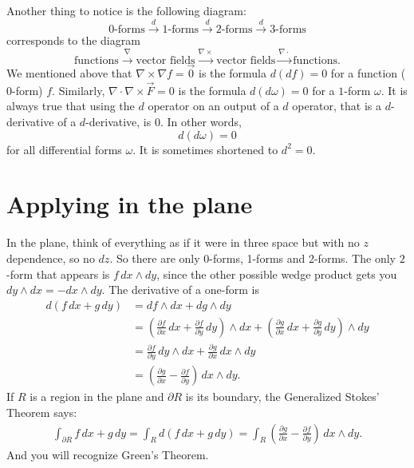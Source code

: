 \documentclass[12pt]{article}
\begin{document}
Another thing to notice is the following diagram:
\[
\text{0-forms} \overset{d}{\to}
\text{1-forms} \overset{d}{\to}
\text{2-forms} \overset{d}{\to}
\text{3-forms}
\]
corresponds to the diagram
\[
\text{functions} \overset{\nabla}{\to}
\text{vector fields} \overset{\nabla \times {}}{\to}
\text{vector fields} \overset{\nabla \cdot {}}{\to}
\text{functions} .
\]
We mentioned above that $\nabla \times \nabla f = \vec{0}$ is the formula $d(df) = 0$
for a function ($0$-form) $f$.
Similarly, $\nabla \cdot \nabla \times \vec{F} = 0$ is the formula $d(d\omega) = 0$
for a $1$-form $\omega$.  It is always true that using the
$d$ operator on an output of a $d$ operator,
that is a $d$-derivative of a $d$-derivative, is $0$.  In other words,
\[
d(d\omega) = 0
\]
for all differential forms $\omega$.  It is sometimes shortened to $d^2 = 0$.

\section*{Applying in the plane}

In the plane, think of everything as if it were in three space but
with no $z$ dependence, so no $dz$.  So there are only 0-forms, 1-forms and 2-forms.
The only $2$-form that appears is $f \, dx \wedge dy$, since
the other possible wedge product gets you $dy \wedge dx = - dx \wedge dy$.
The derivative of a one-form is
\begin{equation*}
\begin{split}
d(f \, dx + g \, dy)
& =
df \wedge dx + dg \wedge dy
\\
& =
\left(\frac{\partial f}{\partial x} \, dx + \frac{\partial f}{\partial y} \, dy \right)  \wedge dx
+
\left(\frac{\partial g}{\partial x} \, dx + \frac{\partial g}{\partial y} \, dy \right)  \wedge dy
\\
& =
\frac{\partial f}{\partial y} \, dy \wedge dx
+
\frac{\partial g}{\partial x} \, dx  \wedge dy
\\
& =
\left(\frac{\partial g}{\partial x} -
\frac{\partial f}{\partial y} \right) \,dx  \wedge dy .
\end{split}
\end{equation*}
If $R$ is a region in the plane and $\partial R$ is its boundary, 
the Generalized Stokes' Theorem says:
\begin{equation*}
\begin{split}
\int_{\partial R}
f \, dx + g \, dy
=
\int_R 
d (f \, dx + g \, dy)
=
\int_R
\left(\frac{\partial g}{\partial x} -
\frac{\partial f}{\partial y} \right) \,dx  \wedge dy .
\end{split}
\end{equation*}
And you will recognize Green's Theorem.
\end{document}
